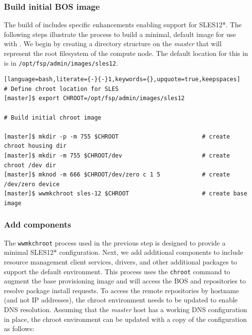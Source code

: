 \documentclass[letterpaper]{article}
\newcommand{\baseOS}{SLES12*}
\begin{document}
\subsubsection{Build initial BOS image} \label{sec:assemble_bos}

The \FSP{} build of \Warewulf{} includes specific enhancements enabling support for
\baseOS{}. The following steps illustrate the process to build a minimal, default
image for use with \Warewulf{}.  We begin by creating a directory structure on the 
{\em master} that will represent the root filesystem of the compute node. The 
default location for this in \FSP{} is in \texttt{/opt/fsp/admin/images/sles12}.

\begin{lstlisting}[language=bash,literate={-}{-}1,keywords={},upquote=true,keepspaces]
# Define chroot location for SLES 
[master]$ export CHROOT=/opt/fsp/admin/images/sles12

# Build initial chroot image

[master]$ mkdir -p -m 755 $CHROOT                        # create chroot housing dir
[master]$ mkdir -m 755 $CHROOT/dev                       # create chroot /dev dir
[master]$ mknod -m 666 $CHROOT/dev/zero c 1 5            # create /dev/zero device
[master]$ wwmkchroot sles-12 $CHROOT                     # create base image
\end{lstlisting}

\subsubsection{Add \FSP{} components} \label{sec:add_components}

The \texttt{wwmkchroot} process used in the previous step is designed to
provide a minimal \baseOS{} configuration. Next, we add additional components to
include resource management client services, \InfiniBand{} drivers, and other
additional packages to support the default \FSP{} environment.  This process uses
the \texttt{chroot} command to augment the base provisioning image and will
access the BOS and \FSP{} repositories to resolve package install requests. To
access the remote repositories by hostname (and not IP addresses), the chroot
environment needs to be updated to enable DNS resolution. Assuming that
the {\em master} host has a working DNS configuration in place, the chroot environment can
be updated with a copy of the configuration as follows:
\end{document}
